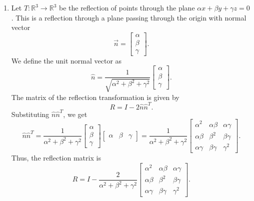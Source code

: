 \documentclass[12pt]{article}
\begin{document}
\begin{enumerate}
\item 
Let \( T: \mathbb{R}^3 \to \mathbb{R}^3 \) be the reflection of points through the plane \( \alpha x + \beta y + \gamma z = 0 \). This is a reflection through a plane passing through the origin with normal vector
\[
\vec{n} = \begin{bmatrix} \alpha \\ \beta \\ \gamma \end{bmatrix}.
\]
We define the unit normal vector as
\[
\hat{n} = \frac{1}{\sqrt{\alpha^2 + \beta^2 + \gamma^2}} \begin{bmatrix} \alpha \\ \beta \\ \gamma \end{bmatrix}.
\]
The matrix of the reflection transformation is given by
\[
R = I - 2 \hat{n} \hat{n}^T.
\]
Substituting \( \hat{n} \hat{n}^T \), we get
\[
\hat{n} \hat{n}^T = \frac{1}{\alpha^2 + \beta^2 + \gamma^2}
\begin{bmatrix}
\alpha \\ \beta \\ \gamma
\end{bmatrix}
\begin{bmatrix}
\alpha & \beta & \gamma
\end{bmatrix}
= \frac{1}{\alpha^2 + \beta^2 + \gamma^2}
\begin{bmatrix}
\alpha^2 & \alpha\beta & \alpha\gamma \\
\alpha\beta & \beta^2 & \beta\gamma \\
\alpha\gamma & \beta\gamma & \gamma^2
\end{bmatrix}.
\]
Thus, the reflection matrix is
\[
R = I - \frac{2}{\alpha^2 + \beta^2 + \gamma^2}
\begin{bmatrix}
\alpha^2 & \alpha\beta & \alpha\gamma \\
\alpha\beta & \beta^2 & \beta\gamma \\
\alpha\gamma & \beta\gamma & \gamma^2
\end{bmatrix}.
\]

\end{enumerate}
\end{document}
